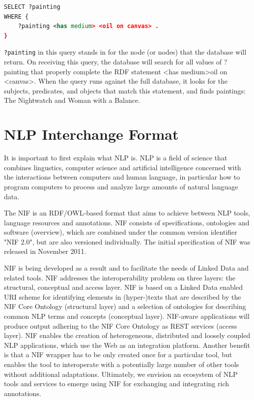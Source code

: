 \documentclass[thesis=M,english,hidelinks]{FITthesis}[2019/12/23]
\begin{document}
\begin{lstlisting}[language=XML, caption=Example triplestore for SPARQL query, label = {lst:sparql-query-example}]
SELECT ?painting
WHERE {
	?painting <has medium> <oil on canvas> .
}
\end{lstlisting}

\lstinline{?painting} in this query stands in for the node (or nodes) that the database will return. On receiving this query, the database will search for all values of ?painting that properly complete the RDF statement \textless has medium\textgreater oil on \textless canvas\textgreater . When the query runs against the full database, it looks for the subjects, predicates, and objects that match this statement, and finds paintings: The Nightwatch and Woman with a Balance.


\section{NLP Interchange Format}

It is important to first explain what \gls{NLP} is. \gls{NLP} is a field of science that combines lingustics, computer science and artificial intelligence concerned with the interactions between computers and human language, in particular how to program computers to process and analyze large amounts of natural language data.

The \gls{NIF} is an \gls{RDF}/\gls{OWL}-based format that aims to achieve between \gls{NLP} tools, language resources and annotations. NIF consists of specifications, ontologies and software (overview), which are combined under the common version identifier "NIF 2.0", but are also versioned individually\cite{nlp_cite}. The initial specification of \gls{NIF} was released in November 2011.

\gls{NIF} is being developed as a result and to facilitate the needs of Linked Data and related tools.  NIF addresses the interoperability problem on three layers: the structural, conceptual and access layer. NIF is based on a Linked Data enabled URI scheme for identifying elements in (hyper-)texts that are described by the NIF Core Ontology (structural layer) and a selection of ontologies for describing common NLP terms and concepts (conceptual layer). NIF-aware applications will produce output adhering to the NIF Core Ontology as REST services (access layer). NIF enables the creation of heterogeneous, distributed and loosely coupled NLP applications, which use the Web as an integration platform. Another benefit is
that a NIF wrapper has to be only created once for a particular tool, but enables the tool to interoperate with a potentially large number of other tools without additional adaptations. Ultimately, we envision an ecosystem of NLP tools and services to emerge using NIF for exchanging and integrating rich annotations.
\end{document}

